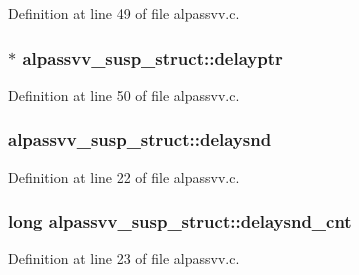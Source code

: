 Definition at line 49 of file alpassvv.\+c.

\subsubsection[{\texorpdfstring{delayptr}{delayptr}}]{$\ast$ alpassvv\+\_\+susp\+\_\+struct\+::delayptr}\hypertarget{structalpassvv__susp__struct_a333b3171a22c3896dcf39c990c9b8f33}{}\label{structalpassvv__susp__struct_a333b3171a22c3896dcf39c990c9b8f33}


Definition at line 50 of file alpassvv.\+c.

\subsubsection[{\texorpdfstring{delaysnd}{delaysnd}}]{ alpassvv\+\_\+susp\+\_\+struct\+::delaysnd}\hypertarget{structalpassvv__susp__struct_a79c5e3cbb77d1af8748ded77f24116a0}{}\label{structalpassvv__susp__struct_a79c5e3cbb77d1af8748ded77f24116a0}


Definition at line 22 of file alpassvv.\+c.

\subsubsection[{\texorpdfstring{delaysnd\+\_\+cnt}{delaysnd_cnt}}]{\setlength{\rightskip}{0pt plus 5cm}long alpassvv\+\_\+susp\+\_\+struct\+::delaysnd\+\_\+cnt}\hypertarget{structalpassvv__susp__struct_afa627499b9a93c716f54bd75216995a5}{}\label{structalpassvv__susp__struct_afa627499b9a93c716f54bd75216995a5}


Definition at line 23 of file alpassvv.\+c.

